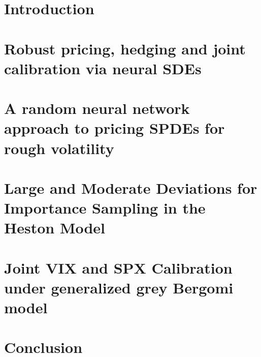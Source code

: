 \chapter{Introduction}



\myclearpage{}
\chapter{Robust pricing, hedging and joint calibration via neural SDEs}
\label{chap:reschap1}
 

\myclearpage{}
\chapter[Random neural networks for rough volatility SPDEs]{A random neural network approach to pricing SPDEs for rough volatility}
\label{chap:reschap2}
 

\myclearpage{}
\chapter[Large and Moderate Deviations for Importance Sampling]{Large and Moderate Deviations for Importance Sampling in the Heston Model}
\label{chap:reschap3}
 

 \myclearpage{}
\chapter[generalized grey Bergomi model]{Joint VIX and SPX Calibration under generalized grey Bergomi model}
\label{chap:reschap4}
 

% 

\myclearpage{}
\chapter{Conclusion}
\label{chap:conclusion}


